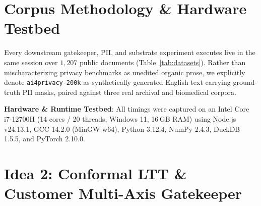 \documentclass{article}
\begin{document}
\section{Corpus Methodology \& Hardware Testbed}
\label{sec:datasets}

Every downstream gatekeeper, PII, and substrate experiment executes live in the same session over $1,207$ public documents (Table~\ref{tab:datasets}). Rather than mischaracterizing privacy benchmarks as unedited organic prose, we explicitly denote \texttt{ai4privacy-200k} \citep{ai4privacy2023} as synthetically generated English text carrying ground-truth PII masks, paired against three real archival and biomedical corpora.

\begin{table}[t]
\caption{Benchmark corpus ($1,207$ total records) spanning real archival/clinical documents and synthetic span-annotated PII records.}
\label{tab:datasets}
\vskip 0.08in
\begin{center}
\end{center}
\vskip -0.14in
\end{table}

\textbf{Hardware \& Runtime Testbed}: All timings were captured on an Intel Core i7-12700H (14 cores / 20 threads, Windows 11, 16\,GB RAM) using Node.js v24.13.1, GCC 14.2.0 (MinGW-w64), Python 3.12.4, NumPy 2.4.3, DuckDB 1.5.5, and PyTorch 2.10.0.

\section{Idea 2: Conformal LTT \& Customer Multi-Axis Gatekeeper}
\label{sec:race3}
\end{document}
